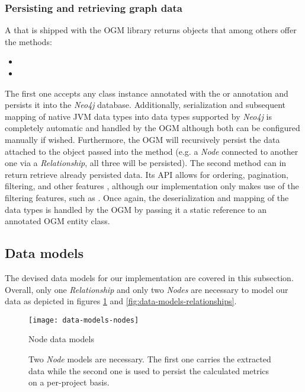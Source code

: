 \documentclass[12pt,a4paper]{report}
\begin{document}
\subsubsection{Persisting and retrieving graph data}
A 
that is shipped with the OGM library returns  objects that among
others offer the methods:
\begin{itemize}[noitemsep]
    \item {}
    \item {}
\end{itemize}
The first one accepts any class instance
annotated with the  or  annotation
and persists it into the \textit{Neo4j} database. Additionally, serialization
and subsequent mapping of native JVM data types into data types supported by
\textit{Neo4j} is completely automatic and handled by the OGM \cite{neo4j-ogm}
although both can be configured manually if wished. Furthermore, the OGM will
recursively persist the data attached to the object passed into the  method (e.g. a \textit{Node} connected to another one via a \textit{
Relationship}, all three will be persisted). The second method can in return
retrieve already persisted data. Its API allows for ordering, pagination,
filtering, and other features \cite{neo4j-ogm}, although our implementation
only makes use of the filtering features, such as . Once
again, the deserialization and mapping of the data types is handled by the OGM
by passing it a static reference to an annotated OGM entity class.


\subsection{Data models} \label{subsect:data-models}

The devised data models for our implementation are covered in this
subsection. Overall, only one \textit{Relationship} and only two \textit{Nodes}
are necessary to model our data as depicted in figures
\ref{fig:data-models-nodes} and \ref{fig:data-models-relationships}.

\begin{figure}[htbp]
\centering
\texttt{[image: data-models-nodes]}
\caption{Node data models}
\caption*{\centering
  Two \textit{Node} models are necessary. The first one carries the extracted
  data while the second one is used to persist the calculated metrics on a
  per\hyp project basis.
}
\label{fig:data-models-nodes}
\end{figure}
\end{document}
